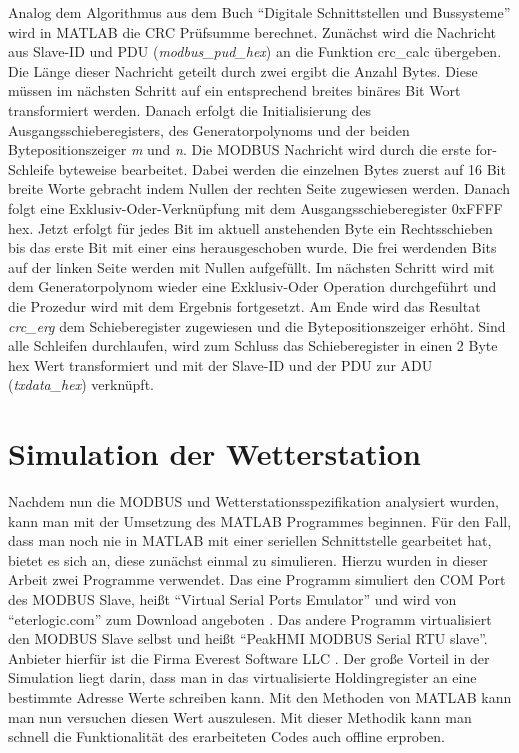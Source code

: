 Analog dem Algorithmus aus dem Buch \enquote{Digitale Schnittstellen und Bussysteme} wird in MATLAB die CRC Prüfsumme berechnet. Zunächst wird die Nachricht aus Slave-ID und PDU (\textit{modbus\_pud\_hex}) an die Funktion \textsf{crc\_calc} übergeben. Die Länge dieser Nachricht geteilt durch zwei ergibt die Anzahl Bytes. Diese müssen im nächsten Schritt auf ein entsprechend breites binäres Bit Wort transformiert werden. Danach erfolgt die Initialisierung des Ausgangsschieberegisters, des Generatorpolynoms und der beiden Bytepositionszeiger \textit{m} und \textit{n}. Die MODBUS Nachricht wird durch die erste for-Schleife byteweise bearbeitet. Dabei werden die einzelnen Bytes zuerst auf 16 Bit breite Worte gebracht indem Nullen der rechten Seite zugewiesen werden. Danach folgt eine Exklusiv-Oder-Verknüpfung mit dem Ausgangsschieberegister 0xFFFF hex. Jetzt erfolgt für jedes Bit im aktuell anstehenden Byte ein Rechtsschieben bis das erste Bit mit einer eins herausgeschoben wurde. Die frei werdenden Bits auf der linken Seite werden mit Nullen aufgefüllt. Im nächsten Schritt wird mit dem Generatorpolynom wieder eine Exklusiv-Oder Operation durchgeführt und die Prozedur wird mit dem Ergebnis fortgesetzt. Am Ende wird das Resultat \textit{crc\_erg} dem Schieberegister zugewiesen und die Bytepositionszeiger erhöht. Sind alle Schleifen durchlaufen, wird zum Schluss das Schieberegister in einen 2 Byte hex Wert transformiert und mit der Slave-ID und der PDU zur ADU (\textit{txdata\_hex}) verknüpft.\cite{Schleicher.2008} 

\section{Simulation der Wetterstation}  
Nachdem nun die MODBUS und Wetterstationsspezifikation analysiert wurden, kann man mit der Umsetzung des MATLAB Programmes beginnen. Für den Fall, dass man noch nie in MATLAB mit einer seriellen Schnittstelle gearbeitet hat, bietet es sich an, diese zunächst einmal zu simulieren. Hierzu wurden in dieser Arbeit zwei Programme verwendet. Das eine Programm simuliert den COM Port des MODBUS Slave, heißt \enquote{Virtual Serial Ports Emulator} und wird von \enquote{eterlogic.com} zum Download angeboten \cite{eterlogic}. Das andere Programm virtualisiert den MODBUS Slave selbst und heißt \enquote{PeakHMI MODBUS Serial RTU slave}. Anbieter hierfür ist die Firma Everest Software LLC \cite{everest}. Der große Vorteil in der Simulation liegt darin, dass man in das virtualisierte Holdingregister an eine bestimmte Adresse Werte schreiben kann. Mit den Methoden von MATLAB kann man nun versuchen diesen Wert auszulesen. Mit dieser Methodik kann man schnell die Funktionalität des erarbeiteten Codes auch offline erproben. 

     
      
